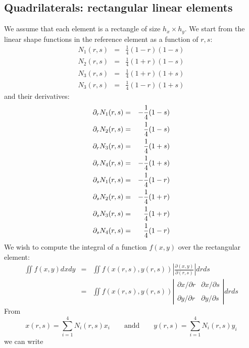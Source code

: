 \subsection{Quadrilaterals: rectangular linear elements} \label{app:qrle}

We assume that each element is a rectangle of size $h_x \times h_y$. 
We start from the linear shape functions in the reference element as a function of $r,s$:
\begin{eqnarray}
N_1(r,s) &=& \frac{1}{4}(1-r)(1-s) \\ 
N_2(r,s) &=& \frac{1}{4}(1+r)(1-s) \\ 
N_3(r,s) &=& \frac{1}{4}(1+r)(1+s) \\ 
N_3(r,s) &=& \frac{1}{4}(1-r)(1+s) 
\end{eqnarray}
and their derivatives:
\begin{eqnarray}
\partial_r N_1(r,s) &=& -\frac{1}{4}(1-s) \nonumber\\
\partial_r N_2(r,s) &=& \frac{1}{4}(1-s) \nonumber\\
\partial_r N_3(r,s) &=& \frac{1}{4}(1+s) \nonumber\\
\partial_r N_4(r,s) &=& -\frac{1}{4}(1+s) \nonumber\\
\partial_s N_1(r,s) &=& -\frac{1}{4}(1-r) \nonumber\\
\partial_s N_2(r,s) &=& -\frac{1}{4}(1+r) \nonumber\\
\partial_s N_3(r,s) &=& \frac{1}{4}(1+r) \nonumber\\
\partial_s N_4(r,s) &=& \frac{1}{4}(1-r) \nonumber
\end{eqnarray}
We wish to compute the integral of a function $f(x,y)$ over the rectangular element:
\begin{eqnarray}
\iint f(x,y) dx dy 
&=& \iint f(x(r,s),y(r,s)) \left| \frac{\partial (x,y)}{\partial (r,s) } \right|  dr ds \\
&=& \iint f(x(r,s),y(r,s)) 
\left| 
\begin{array}{cc}
\partial x/\partial r & \partial x/\partial s \\ \\
\partial y/\partial r & \partial y/\partial s 
\end{array}
\right|  dr ds 
\end{eqnarray}
From 
\[
x(r,s)=\sum_{i=1}^4 N_i(r,s) x_i 
\qquad \text{andd} \qquad 
y(r,s)=\sum_{i=1}^4 N_i(r,s) y_i 
\]
we can write
